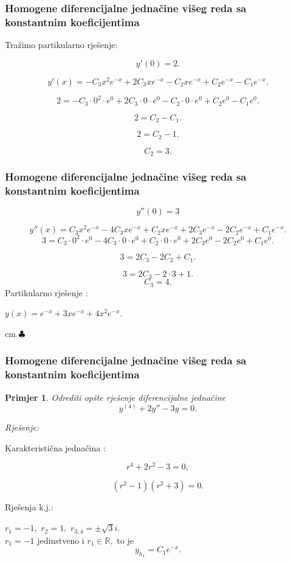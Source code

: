 \documentclass{beamer}
\newtheorem{pri}{\textrm{Primjer}}[section]
\begin{document}
\begin{frame}
\frametitle{Homogene diferencijalne jednačine višeg reda sa konstantnim koeficijentima} 

Tražimo partikularno rješenje:



$$y'(0) = 2.$$

$$y'(x) =-C_{3}x^{2}e^{-x}+ 2C_{3}xe^{-x} - C_{2}xe^{-x}+ C_{2}e^{-x} -  C_{1}e^{-x}.$$

$$2 = -C_{3}\cdot 0^{2}\cdot e^{0}+ 2C_{3}\cdot 0 \cdot e^{0} - C_{2}\cdot 0 \cdot e^{0}+ C_{2}e^{0} -  C_{1}e^{0}.$$

$$2 =  C_{2} -  C_{1}.$$

$$2 =  C_{2} -  1.$$

$$C_{2} = 3.$$
\end{frame}
\begin{frame}
\frametitle{Homogene diferencijalne jednačine višeg reda sa konstantnim koeficijentima}
$$y''(0) = 3$$

$$y''(x) =C_{3}x^{2}e^{-x} - 4C_{3}xe^{-x} + C_{2}xe^{-x} + 2C_{3}e^{-x} - 2C_{2}e^{-x} +  C_{1}e^{-x}.$$
$$3 =C_{3} \cdot 0^{2} \cdot e^{0} - 4C_{3}\cdot 0 \cdot e^{0} + C_{2}\cdot 0 \cdot e^{0} + 2C_{3}e^{0} - 2C_{2}e^{0} +  C_{1}e^{0}.$$

$$3 = 2C_{3} - 2C_{2} +  C_{1}.$$

$$3 = 2C_{3} - 2 \cdot 3 +  1.$$
$$C_{3} = 4.$$
Partikularno rješenje :

$y(x) = e^{-x} + 3xe^{-x} + 4x^{2}e^{-x}.$

 cm $\clubsuit$ \\
\end{frame}

\begin{frame}
\frametitle{Homogene diferencijalne jednačine višeg reda sa konstantnim koeficijentima}

\begin{pri}
Odrediti opšte rješenje diferencijalne jednačine $$y^{(4)} + 2y'' -3y = 0.$$
\end{pri}

\emph{Rješenje:}

Karakteristična jednačina :

$$r^{4} + 2r^{2} -3 = 0,$$


$$(r^{2} - 1)(r^{2} + 3) = 0.$$

Rješenja k.j.:

$r_{1} = -1, $ $r_{2} = 1, $ $r_{3,4} = \pm \sqrt{3}i .$  \\

 $r_{1} = -1 $ jedinstveno i $r_{1} \in \mathbb{R}, $ to je $$y_{h_{1}} = C_{1}e^{-x}.$$ 
 

 
 \end{frame}
 
\end{document}
